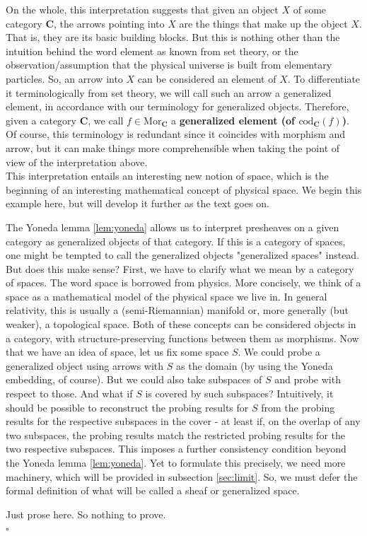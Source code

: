 On the whole, this interpretation suggests that given an object $X$ of some category $\mathbf{C}$, the arrows pointing into $X$ are the things that make up the object $X$.
That is, they are its basic building blocks.
But this is nothing other than the intuition behind the word {\glqq}element{\grqq} as known from set theory, or the observation/assumption that the physical universe is built from elementary particles.
So, an arrow into $X$ can be considered an element of $X$.
To differentiate it terminologically from set theory, we will call such an arrow a generalized element, in accordance with our terminology for generalized objects.
Therefore, given a category $\mathbf{C}$, we call $f \in \mathrm{Mor}_{\mathbf{C}}$ a \textbf{generalized element (of $\mathrm{cod}_{\mathbf{C}}(f)$)}.
Of course, this terminology is redundant since it coincides with morphism and arrow, but it can make things more comprehensible when taking the point of view of the interpretation above.
\\
This interpretation entails an interesting new notion of {\glqq}space{\grqq}, which is the beginning of an interesting mathematical concept of physical space.
We begin this example here, but will develop it further as the text goes on.
\\
\begin{exa}
\label{exa:gs1}
The Yoneda lemma \ref{lem:yoneda} allows us to interpret presheaves on a given category as generalized objects of that category.
If this is a category of spaces, one might be tempted to call the generalized objects "generalized spaces" instead.
But does this make sense? First, we have to clarify what we mean by a category of spaces.
The word {\glqq}space{\grqq} is borrowed from physics.
More concisely, we think of a space as a mathematical model of the physical space we live in.
In general relativity, this is usually a {\glqq}(semi-Riemannian) manifold{\grqq} or, more generally (but weaker), a topological space.
Both of these concepts can be considered objects in a category, with {\glqq}structure-preserving{\grqq} functions between them as morphisms.
Now that we have an idea of space, let us fix some space $S$.
We could probe a generalized object using arrows with $S$ as the domain (by using the Yoneda embedding, of course).
But we could also take subspaces of $S$ and probe with respect to those.
And what if $S$ is covered by such subspaces? Intuitively, it should be possible to reconstruct the probing results for $S$ from the probing results for the respective subspaces in the cover - at least if, on the overlap of any two subspaces, the probing results match the restricted probing results for the two respective subspaces.
This imposes a further consistency condition beyond the Yoneda lemma \ref{lem:yoneda}.
Yet to formulate this precisely, we need more machinery, which will be provided in subsection \ref{sec:limit}.
So, we must defer the formal definition of what will be called a {\glqq}sheaf{\grqq} or generalized space.
\end{exa}
\begin{prf}
Just prose here.
So nothing to prove.
\\
\phantom{proven}
\hfill
$\square$
\end{prf}
